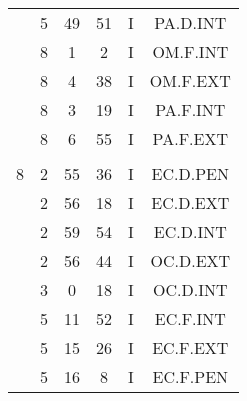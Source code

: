 \documentclass[12pt, a4paper]{article}
\begin{document}
\begin{multicols}{3}
{\begin{tabular}{c c c c c c}
	 	 	 	 & 5 & 49 & 51 & I & PA.D.INT\\%
	 	 	 	 & 8 & 1 & 2 & I & OM.F.INT\\%
	 	 	 	 & 8 & 4 & 38 & I & OM.F.EXT\\%
	 	 	 	 & 8 & 3 & 19 & I & PA.F.INT\\%
	 	 	 	 & 8 & 6 & 55 & I & PA.F.EXT\\%
	 	 	 	 & & & & & \\%
	 	 	 	8 & 2 & 55 & 36 & I & EC.D.PEN\\%
	 	 	 	 & 2 & 56 & 18 & I & EC.D.EXT\\%
	 	 	 	 & 2 & 59 & 54 & I & EC.D.INT\\%
	 	 	 	 & 2 & 56 & 44 & I & OC.D.EXT\\%
	 	 	 	 & 3 & 0 & 18 & I & OC.D.INT\\%
	 	 	 	 & 5 & 11 & 52 & I & EC.F.INT\\%
	 	 	 	 & 5 & 15 & 26 & I & EC.F.EXT\\%
	 	 	 	 & 5 & 16 & 8 & I & EC.F.PEN\\%
	 	 \end{tabular}
 	}
\end{multicols}
\end{document}
